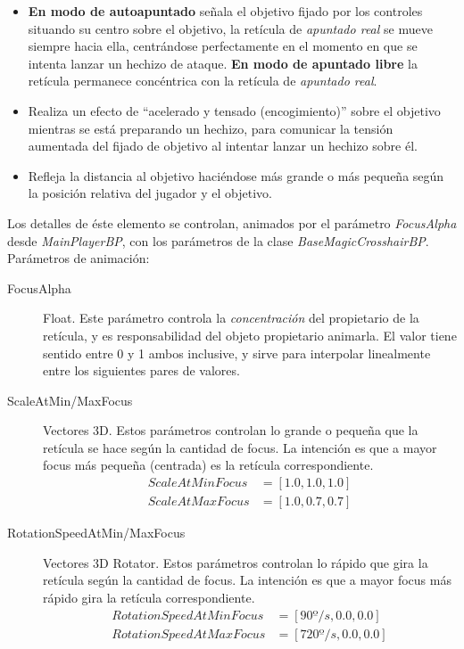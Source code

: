 \documentclass[12pt]{report}
\begin{document}
\begin{itemize}
	\item \textbf{En modo de autoapuntado} señala el objetivo fijado por los controles situando su centro sobre el objetivo, la retícula de \textit{apuntado real} se mueve siempre hacia ella, centrándose perfectamente en el momento en que se intenta lanzar un hechizo de ataque. \textbf{En modo de apuntado libre} la retícula permanece concéntrica con la retícula de \textit{apuntado real}.
	\item Realiza un efecto de ``acelerado y tensado (encogimiento)'' sobre el objetivo mientras se está preparando un hechizo, para comunicar la tensión aumentada del fijado de objetivo al intentar lanzar un hechizo sobre él.
	\item Refleja la distancia al objetivo haciéndose más grande o más pequeña según la posición relativa del jugador y el objetivo.
\end{itemize}

Los detalles de éste elemento se controlan, animados por el parámetro \textit{FocusAlpha} desde \textit{\emph{MainPlayerBP}}, con los parámetros de la clase \textit{\emph{BaseMagicCrosshairBP}}. Parámetros de animación:

\begin{description}
	\item[FocusAlpha] Float. Este parámetro controla la \textit{concentración} del propietario de la retícula, y es responsabilidad del objeto propietario animarla. El valor tiene sentido entre 0 y 1 ambos inclusive, y sirve para interpolar linealmente entre los siguientes pares de valores.
	\item[ScaleAtMin/MaxFocus] Vectores 3D. Estos parámetros controlan lo grande o pequeña que la retícula se hace según la cantidad de focus. La intención es que a mayor focus más pequeña (centrada) es la retícula correspondiente.
    \begin{align}
		ScaleAtMinFocus &= [1.0, 1.0, 1.0] \\
		ScaleAtMaxFocus &= [1.0, 0.7, 0.7]
   	\end{align}
	\item[RotationSpeedAtMin/MaxFocus] Vectores 3D Rotator. Estos parámetros controlan lo rápido que gira la retícula según la cantidad de focus. La intención es que a mayor focus más rápido gira la retícula correspondiente.
    \begin{align}
		RotationSpeedAtMinFocus &= [ 90º/s, 0.0, 0.0] \\
		RotationSpeedAtMaxFocus &= [720º/s, 0.0, 0.0]
   	\end{align}
\end{description}
\end{document}
